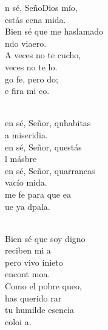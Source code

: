 \begin{cancion}%
	n sé, SeñoDios mío, \\
	 estás cena mida.\\
	Bien sé que me haslamado \\
	ndo viaero.\\
\jump
	A veces no te cucho, \\
	veces no te lo.\\
	go fe, pero do; \\
	e fira mi co.  \\\jump\\
	\begin{chorus}%
	en sé, Señor, quhabitas \\
	a miseridia. \\
	en sé, Señor, questás\\
	l másbre\\
	en sé, Señor, quarrancas\\
	vacío mida. \\
	me fe para que ea\\
	ue ya  dpala.\\
	\end{chorus}%
	\jump\\
	Bien sé que soy digno \\
	reciben mi a\\
	pero vivo inieto\\
	 encont  moa.\\
\jump
	Como el pobre queo, \\
	 has querido rar\\
	 tu humilde esencia \\
	 coloi a. \\
\end{cancion}%
